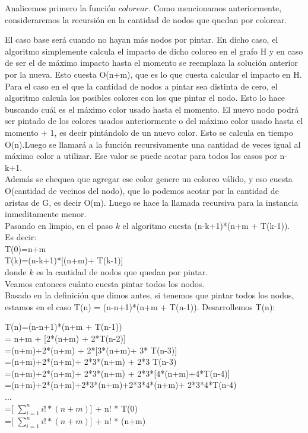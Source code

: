 \indent Analicemos primero la función $colorear$. Como mencionamos anteriormente, consideraremos la recursión en la cantidad de nodos que quedan por colorear.

\indent El caso base será cuando no hayan más nodos por pintar. En dicho caso, el algoritmo simplemente calcula el impacto de dicho coloreo en el grafo H y en caso de ser el de máximo impacto hasta el momento se reemplaza la solución anterior por la nueva. Esto cuesta O(n+m), que es lo que cuesta calcular el impacto en H.\\
\indent Para el caso en el que la cantidad de nodos a pintar sea distinta de cero, el algoritmo calcula los posibles colores con los que pintar el nodo. Esto lo hace buscando cuál es el máximo color usado hasta el momento. El nuevo nodo podrá ser pintado de los colores usados anteriormente o del máximo color usado hasta el momento + 1, es decir pintándolo de un nuevo color. Esto se calcula en tiempo O(n).Luego se llamará a la función recursivamente una cantidad de veces igual al máximo color a utilizar. Ese valor se puede acotar para todos los casos por n-k+1.\\
\indent Además se chequea que agregar ese color genere un coloreo válido, y eso cuesta O(cantidad de vecinos del nodo), que lo podemos acotar por la cantidad de aristas de G, es decir O(m). Luego se hace la llamada recursiva para la instancia inmeditamente menor.\\
\indent Pasando en limpio, en el paso $k$ el algoritmo cuesta (n-k+1)*(n+m + T(k-1)).\\
\indent Es decir:\\

\indent T(0)=n+m\\
\indent T(k)=(n-k+1)*[(n+m)+ T(k-1)]\\

donde $k$ es la cantidad de nodos que quedan por pintar.\\


Veamos entonces cuánto cuesta pintar todos los nodos.\\
Basado en la definición que dimos antes, si tenemos que pintar todos los nodos, estamos en el caso T(n) = (n-n+1)*(n+m + T(n-1)).
Desarrollemos T(n):
\vspace{1em}

\begin{centering}
T(n)=(n-n+1)*(n+m + T(n-1))\\
= n+m + [2*(n+m) + 2*T(n-2)]\\
=(n+m)+2*(n+m) + 2*[3*(n+m)+ 3* T(n-3)]\\
=(n+m)+2*(n+m)+ 2*3*(n+m) + 2*3 T(n-3)\\
=(n+m)+2*(n+m)+ 2*3*(n+m) + 2*3*[4*(n+m)+4*T(n-4)]\\
=(n+m)+2*(n+m)+2*3*(n+m)+2*3*4*(n+m)+ 2*3*4*T(n-4)\\
...\\
=[ $\sum_{i=1}^{n} i! * (n+m) $] + n! * T(0) \\
=[ $\sum_{i=1}^{n} i! * (n+m) $] + n! * (n+m)\\
\end{centering}

